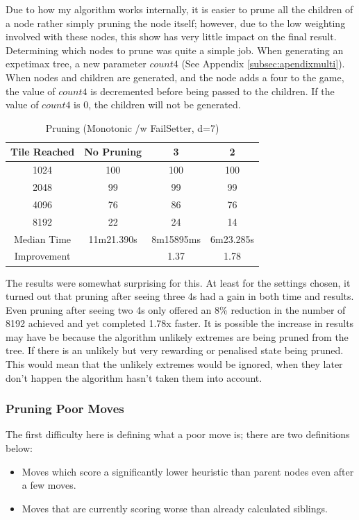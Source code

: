 \documentclass{article}
\begin{document}
Due to how my algorithm works internally, it is easier to prune all the children of a node rather simply pruning the node itself; however, due to the low weighting involved with these nodes, this show has very little impact on the final result. Determining which nodes to prune was quite a simple job. When generating an expetimax tree, a new parameter $count4$ (See Appendix \ref{subsec:apendixmulti}). When nodes and children are generated, and the node adds a four to the game, the value of $count4$ is decremented before being passed to the children. If the value of $count4$ is 0, the children will not be generated.

\begin{table}[]
    \centering
    \begin{tabular}{|c|ccc|}
    \hline
Tile Reached&No Pruning&3&2\\
\hline
1024&100&100&100\\
2048&99&99&99\\
4096&76&86&76\\
8192&22&24&14\\
\hline
Median Time&11m21.390s&8m15895ms&6m23.285s\\
Improvement&&1.37&1.78\\
\hline
    \end{tabular}
    \caption{Pruning (Monotonic /w FailSetter, d=7)}
    \label{tab:pruning}
\end{table}

The results were somewhat surprising for this. At least for the settings chosen, it turned out that pruning after seeing three 4s had a gain in both time and results. Even pruning after seeing two 4s only offered an 8\% reduction in the number of 8192 achieved and yet completed 1.78x faster. It is possible the increase in results may have be because the algorithm unlikely extremes are being pruned from the tree. If there is an unlikely but very rewarding or penalised state being pruned. This would mean that the unlikely extremes would be ignored, when they later don't happen the algorithm hasn't taken them into account.

\subsubsection{Pruning Poor Moves}
The first difficulty here is defining what a poor move is; there are two definitions below:
\begin{itemize}
    \item Moves which score a significantly lower heuristic than parent nodes even after a few moves.
    \item Moves that are currently scoring worse than already calculated siblings.
\end{itemize}
\end{document}
